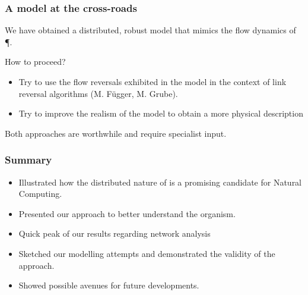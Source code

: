 \documentclass[	hyperref={pdfpagelabels=false}, xcolor=dvipsnames,
		11pt]{beamer}
\begin{document}
\begin{frame}
	\frametitle{A model at the cross-roads}

	We have obtained a distributed, robust model that mimics the flow dynamics of \P.

	\begin{alertblock}{How to proceed?}
		\begin{itemize}
			\item Try to use the flow reversals exhibited in the model in the context of link reversal algorithms (M. Függer, M. Grube).
			\item Try to improve the realism of the model to obtain a more physical description
		\end{itemize}
	\end{alertblock}

	Both approaches are worthwhile and require specialist input.
\end{frame}

\begin{frame}
	\frametitle{Summary}

	\begin{itemize}
		\item Illustrated how the distributed nature of \Pp is a promising candidate for Natural Computing.
		\item Presented our approach to better understand the organism.
		\item Quick peak of our results regarding network analysis
		\item Sketched our modelling attempts and demonstrated the validity of the approach.
		\item Showed possible avenues for future developments.
	\end{itemize}
\end{frame}

\end{document}
